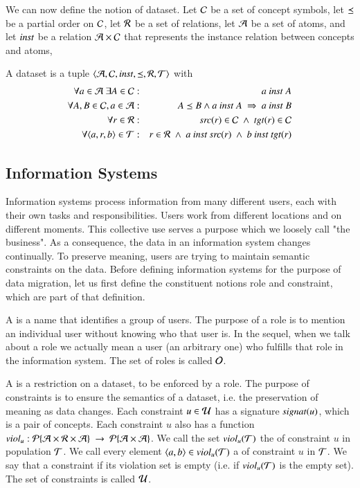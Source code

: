 \documentclass{elsarticle}
\begin{document}
	We can now define the notion of dataset.
	Let	$\mathcal{C}$ be a set of concept symbols,
	let $\preceq$ be a partial order on $\mathcal{C}$,
	let $\mathcal{R}$ be a set of relations,
	let $\mathcal{A}$ be a set of atoms,
	and let $\text{\it inst\/}$ be a relation $\mathcal{A}\times\mathcal{C}$ that represents the instance relation between concepts and atoms,
\begin{definition}[dataset]
	\label{def:dataset}
	\item A dataset is a tuple $\langle\mathcal{A},\mathcal{C},\text{\it inst\/},\preceq,\mathcal{R},\mathcal{T}\rangle$ with
	\begin{eqnarray}
		\forall a\in\atoms\ \exists A\in\concepts&:&a\ \inst\ A\\
		\forall A,B\in\concepts, a\in\atoms&:&A\isa B\wedge a\ \inst\ A\ \Rightarrow\ a\ \inst\ B\\
		\forall r\in\rels&:&\src{r}\in\concepts\ \wedge\ \tgt{r}\in\concepts\\
		\forall\triple{a}{r}{b}\in\triples&:&r\in\rels\ \wedge\ a\ \inst\ \src{r}\ \wedge\ b\ \inst\ \tgt{r}\\
	\end{eqnarray}
\end{definition}

\subsection{Information Systems}
\label{sct:Information Systems}
	Information systems process information from many different users, each with their own tasks and responsibilities.
	Users work from different locations and on different moments.
	This collective use serves a purpose which we loosely call "the business".
	As a consequence, the data in an information system changes continually.
	To preserve meaning, users are trying to maintain semantic constraints on the data.
	Before defining information systems for the purpose of data migration,
	let us first define the constituent notions role and constraint, which are part of that definition.

	A  is a name that identifies a group of users.
	The purpose of a role is to mention an individual user without knowing who that user is.
	In the sequel, when we talk about a role we actually mean a user (an arbitrary one) who fulfills that role in the information system.
	The set of roles is called $\mathcal{O}$.

	A  is a restriction on a dataset, to be enforced by a role.
	The purpose of constraints is to ensure the semantics of a dataset, i.e. the preservation of meaning as data changes.
	Each constraint $u\in\mathcal{U}$ has a signature $\text{\it signat\/}(u)$, which is a pair of concepts.
	Each constraint $u$ also has a function $\id{viol}_u:\powerset{\atoms\times\rels\times\atoms}\ \rightarrow\ \powerset{\atoms\times\atoms}$.
	We call the set $\text{\it viol\/}_{u}(\mathcal{T})$ the  of constraint $u$ in population $\mathcal{T}$.
	We call every element $\langle{a},{b}\rangle\in\text{\it viol\/}_{u}(\mathcal{T})$ a  of constraint $u$ in $\mathcal{T}$.
	We say that a constraint  if its violation set is empty (i.e. if $\text{\it viol\/}_{u}(\mathcal{T})$ is the empty set).
	The set of constraints is called $\mathcal{U}$.
\end{document}
